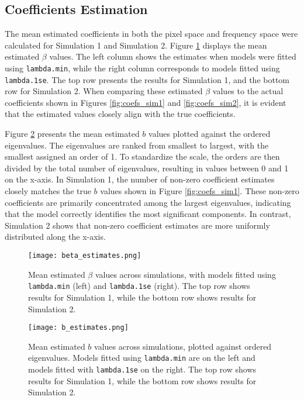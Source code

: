 \documentclass[12pt]{article}
\begin{document}
\subsection*{Coefficients Estimation}

The mean estimated coefficients in both the pixel space and frequency space were calculated for Simulation 1 and Simulation 2. Figure \ref{fig:beta_estimates} displays the mean estimated \( \beta \) values. The left column shows the estimates when models were fitted using \texttt{lambda.min}, while the right column corresponds to models fitted using \texttt{lambda.1se}. The top row presents the results for Simulation 1, and the bottom row for Simulation 2. When comparing these estimated \( \beta \) values to the actual coefficients shown in Figures \ref{fig:coefs_sim1} and \ref{fig:coefs_sim2}, it is evident that the estimated values closely align with the true coefficients.

Figure \ref{fig:b_estimates} presents the mean estimated \( b \) values plotted against the ordered eigenvalues. The eigenvalues are ranked from smallest to largest, with the smallest assigned an order of 1. To standardize the scale, the orders are then divided by the total number of eigenvalues, resulting in values between 0 and 1 on the x-axis. In Simulation 1, the number of non-zero coefficient estimates closely matches the true \( b \) values shown in Figure \ref{fig:coefs_sim1}. These non-zero coefficients are primarily concentrated among the largest eigenvalues, indicating that the model correctly identifies the most significant components. In contrast, Simulation 2 shows that non-zero coefficient estimates are more uniformly distributed along the x-axis.

\begin{figure}[h!] 
	\centering
  \texttt{[image: beta\_estimates.png]} 
  \caption{Mean estimated \( \beta \) values across simulations, with models fitted using \texttt{lambda.min} (left) and
  \texttt{lambda.1se} (right). The top row shows results for Simulation 1, while the bottom row shows results for Simulation 2.}
	\label{fig:beta_estimates} 
\end{figure}

\begin{figure}[h!] 
	\centering
  \texttt{[image: b\_estimates.png]} 
  \caption{Mean estimated \( b \) values across simulations, plotted against ordered eigenvalues. Models fitted using
  \texttt{lambda.min} are on the left and models fitted with \texttt{lambda.1se} on the right. The top row shows results for Simulation 1, while the bottom row shows results for Simulation 2.}
  \label{fig:b_estimates} 
\end{figure}
\end{document}
